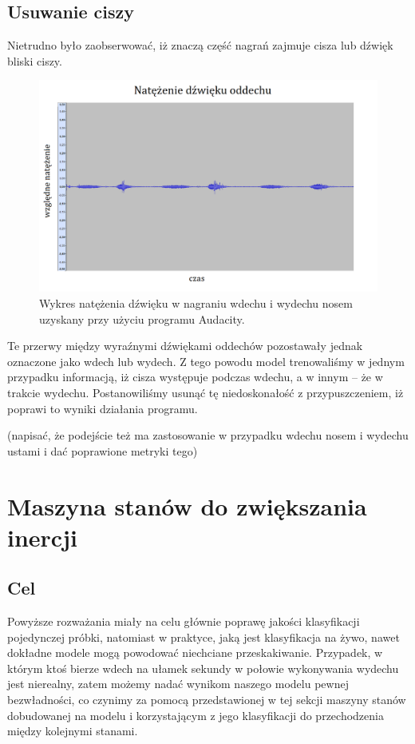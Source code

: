 \documentclass[polish]{article}
\begin{document}
\subsection{Usuwanie ciszy}
Nietrudno było zaobserwować, iż znaczą część nagrań zajmuje cisza lub dźwięk bliski ciszy.
\begin{figure}[H]
	\centering
	\includegraphics[width=13cm]{natezenie_wydech_nosem}
	\caption{Wykres natężenia dźwięku w nagraniu wdechu i wydechu nosem uzyskany przy użyciu programu Audacity.}
\end{figure}
Te przerwy między wyraźnymi dźwiękami oddechów pozostawały jednak oznaczone jako wdech lub wydech. Z tego powodu model trenowaliśmy w jednym przypadku informacją, iż cisza występuje podczas wdechu, a w innym -- że w trakcie wydechu. Postanowiliśmy usunąć tę niedoskonałość z przypuszczeniem, iż poprawi to wyniki działania programu.


(napisać, że podejście też ma zastosowanie w przypadku wdechu nosem i wydechu ustami i dać poprawione metryki tego)

\section{Maszyna stanów do zwiększania inercji}
\subsection{Cel}
Powyższe rozważania miały na celu głównie poprawę jakości klasyfikacji pojedynczej próbki, natomiast w praktyce, jaką jest klasyfikacja na żywo, nawet dokładne modele mogą powodować niechciane przeskakiwanie.
Przypadek, w którym ktoś bierze wdech na ułamek sekundy w połowie wykonywania wydechu jest nierealny, zatem możemy nadać wynikom naszego modelu pewnej bezwładności, co czynimy za pomocą przedstawionej
w tej sekcji maszyny stanów dobudowanej na modelu i korzystającym z jego klasyfikacji do przechodzenia między kolejnymi stanami.
\end{document}
